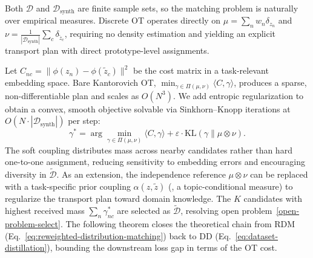 \begin{foldable} %
  Both $\mathcal{D}$ and $\mathcal{D}_\text{synth}$ are finite sample sets, so the matching problem is naturally over empirical measures.
  Discrete \ac{OT} operates directly on $\mu = \sum_n w_n \delta_{z_n}$ and $\nu = \frac{1}{|\mathcal{D}_\text{synth}|}\sum_c \delta_{\tilde{z}_c}$, requiring no density estimation and yielding an explicit transport plan with direct prototype-level assignments.
\end{foldable}

\begin{foldable} %
  Let $C_{nc} = \|\phi(z_n) - \phi(\tilde{z}_c)\|^2$ be the cost matrix in a task-relevant embedding space.
  Bare Kantorovich \ac{OT}, $\min_{\gamma \in \Pi(\mu,\nu)} \langle C, \gamma \rangle$, produces a sparse, non-differentiable plan and scales as $O(N^3)$.
  We add entropic regularization to obtain a convex, smooth objective solvable via Sinkhorn--Knopp iterations at $O(N \cdot |\mathcal{D}_\text{synth}|)$ per step:
  \begin{equation}
    \gamma^* = \arg\min_{\gamma \in \Pi(\mu,\nu)} \langle C, \gamma \rangle + \varepsilon \cdot \text{KL}(\gamma \| \mu \otimes \nu).
    \label{eq:ot}
  \end{equation}
  The soft coupling distributes mass across nearby candidates rather than hard one-to-one assignment, reducing sensitivity to embedding errors and encouraging diversity in $\tilde{\mathcal{D}}$.
  As an extension, the independence reference $\mu \otimes \nu$ can be replaced with a task-specific prior coupling $\alpha(z, \tilde{z})$ (\eg, a topic-conditional measure) to regularize the transport plan toward domain knowledge.
  The $K$ candidates with highest received mass $\sum_n \gamma^*_{nc}$ are selected as $\tilde{\mathcal{D}}$, resolving open problem~\ref{open-problem-select}.
  The following theorem closes the theoretical chain from \ac{RDM} (Eq.~\ref{eq:reweighted-distribution-matching}) back to \ac{DD} (Eq.~\ref{eq:dataset-distillation}), bounding the downstream loss gap in terms of the \ac{OT} cost.


\end{foldable}
